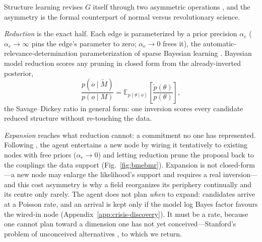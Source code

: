 \documentclass[11pt]{article}
\newcommand{\Eq}[2]{\mathbb{E}_{#1}\!\left[#2\right]}
\begin{document}
Structure learning revises $G$ itself through two asymmetric operations
\citep{friston2017curiosity,smith2020structure}, and the asymmetry is the formal counterpart of normal
versus revolutionary science.

\emph{Reduction} is the exact half. Each edge is parameterized by a prior precision $\alpha_e$
($\alpha_e\to\infty$ pins the edge's parameter to zero; $\alpha_e\to0$ frees it), the
automatic-relevance-determination parameterization of sparse Bayesian learning
\citep{mackay1992,tipping2001}. Bayesian model reduction \citep{friston2011,friston2018bmr} scores any
pruning in closed form from the already-inverted posterior,
\begin{equation}
\frac{p(o\mid\tilde M)}{p(o\mid M)}=\Eq{p(\theta\mid o)}{\frac{\tilde p(\theta)}{p(\theta)}},
\label{eq:bmr}
\end{equation}
the Savage--Dickey ratio in general form: one inversion scores every candidate reduced structure
without re-touching the data.

\emph{Expansion} reaches what reduction cannot: a commitment no one has represented. Following
\citet{friston2017curiosity}, the agent entertains a new node by wiring it tentatively to existing
nodes with free priors ($\alpha_e\to0$) and letting reduction prune the proposal back to the couplings
the data support (Fig.~\ref{fig:bmebmr}). Expansion is not closed-form---a new node may enlarge the
likelihood's support and requires a real inversion---and this cost asymmetry is why a field
reorganizes its periphery continually and its centre only rarely. The agent does not plan \emph{when}
to expand: candidates arrive at a Poisson rate, and an arrival is kept only if the model log Bayes
factor favours the wired-in node (Appendix~\ref{app:crisis-discovery}). It must be a rate,
because one cannot plan toward a dimension one has not yet conceived---Stanford's problem of
unconceived alternatives \citep{stanford2006}, to which we return.
\end{document}
